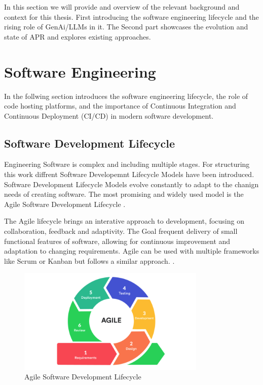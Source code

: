 In this section we will provide and overview of the relevant background and context for this thesis. First introducing the software engineering lifecycle and the rising role of GenAi/LLMs in it. The Second part showcases the evolution and state of APR and explores existing approaches.

\section{Software Engineering}
In the follwing section introduces the software engineering lifecycle, the role of code hosting platforms, and the importance of Continuous Integration and Continuous Deployment (CI/CD) in modern software development.
\subsection{Software Development Lifecycle}
Engineering Software is complex and including multiple stages. For structuring this work diffrent Software Developemnt Lifecycle Models have been introduced. Software Development Lifecycle Models evolve constantly to adapt to the chanign needs of creating software. The most promising and widely used model is the Agile Software Development Lifecycle \cite{rupareliaSoftwareDevelopmentLifecycle2010}.

The Agile lifecycle brings an interative approach to development, focusing on collaboration, feedback and adaptivity. The Goal frequent delivery of small functional features of software, allowing for continuous improvement and adaptation to changing requirements. Agile can be used with multiple frameworks like Scrum or Kanban but follows a similar approach. \cite{rupareliaSoftwareDevelopmentLifecycle2010}.

\begin{figure}[htbp]
    \centering
    \includegraphics[width=0.8\textwidth]{images/agile-cycle.png}
    \caption{Agile Software Development Lifecycle}
    \label{fig:agile-cycle}
\end{figure}

